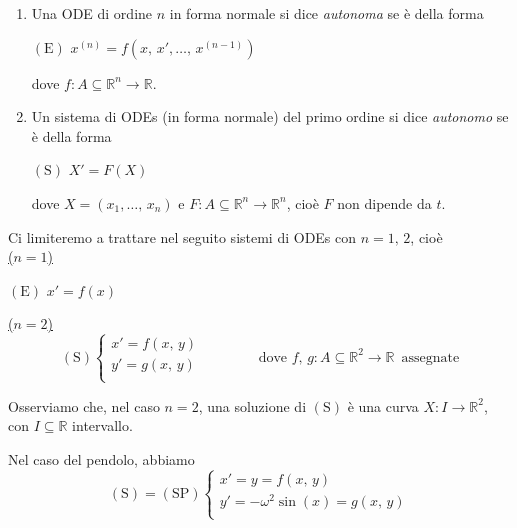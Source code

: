 \begin{definition}
\mbox{}
\begin{enumerate}[labelindent=\parindent,leftmargin=*,label=\textnormal{(\roman*)},start=1]
\item Una ODE di ordine $n$ in forma normale si dice \emph{autonoma} se è della forma
\begin{center}
$\mathrm{(E)}$
\hfill
$\displaystyle
x^{(n)} = f(x,\,x',\ldots,\,x^{(n-1)})
$
\hfill \null \\
\end{center}
dove $f : A \subseteq \mathbb{R}^n \longrightarrow \mathbb{R}$.
\item Un sistema di ODEs (in forma normale) del primo ordine si dice \emph{autonomo} se è della forma
\begin{center}
$\mathrm{(S)}$
\hfill
$\displaystyle
X' = F(X)
$
\hfill \null \\
\end{center}
dove $X = (x_1,\ldots,\,x_n)$ e $F : A \subseteq \mathbb{R}^n \longrightarrow \mathbb{R}^n$, cioè $F$ non dipende da $t$.
\end{enumerate}
\end{definition}

Ci limiteremo a trattare nel seguito sistemi di ODEs con $n = 1,\,2$, cioè\\
\noindent\underline{($n = 1$)}
\begin{center}
$\mathrm{(E)}$
\hfill
$\displaystyle
x' = f(x)
$
\hfill \null \\
\end{center}
\vskip 12pt
\noindent\underline{($n = 2$)}
$$
\mathrm{(S)}
\begin{cases}
x' = f(x,\,y)\\
y' = g(x,\,y)\\
\end{cases}
\qquad\qquad
\text{dove } f,\,g : A \subseteq \mathbb{R}^2 \longrightarrow \mathbb{R} \, \text{ assegnate}
$$

Osserviamo che, nel caso $n = 2$, una soluzione di $\mathrm{(S)}$ è una curva $X : I \longrightarrow \mathbb{R}^2$, con $I \subseteq \mathbb{R}$ intervallo.

Nel caso del pendolo, abbiamo
$$
\mathrm{(S)} = \mathrm{(SP)}
\begin{cases}
x' = y = f(x,\,y)\\
y' = -\omega^2\sin(x) = g(x,\,y)\\
\end{cases}
$$

